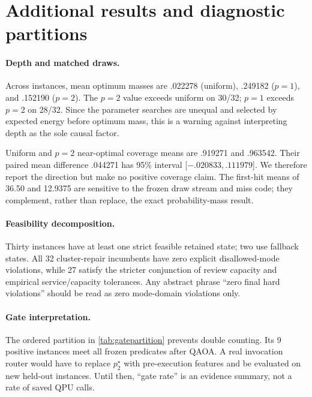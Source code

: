 \section{Additional results and diagnostic partitions}
\label{app:additional}



\paragraph{Depth and matched draws.}
Across instances, mean optimum masses are .022278 (uniform), .249182 ($p=1$), and .152190 ($p=2$). The $p=2$ value exceeds uniform on 30/32; $p=1$ exceeds $p=2$ on 28/32. Since the parameter searches are unequal and selected by expected energy before optimum mass, this is a warning against interpreting depth as the sole causal factor.

Uniform and $p=2$ near-optimal coverage means are .919271 and .963542. Their paired mean difference .044271 has 95\% interval [$-.020833,.111979$]. We therefore report the direction but make no positive coverage claim. The first-hit means of 36.50 and 12.9375 are sensitive to the frozen draw stream and miss code; they complement, rather than replace, the exact probability-mass result.

\paragraph{Feasibility decomposition.}
Thirty instances have at least one strict feasible retained state; two use fallback states. All 32 cluster-repair incumbents have zero explicit disallowed-mode violations, while 27 satisfy the stricter conjunction of review capacity and empirical service/capacity tolerances. Any abstract phrase ``zero final hard violations'' should be read as zero mode-domain violations only.

\paragraph{Gate interpretation.}
The ordered partition in \cref{tab:gatepartition} prevents double counting. Its 9 positive instances meet all frozen predicates after QAOA. A real invocation router would have to replace $p_2^\star$ with pre-execution features and be evaluated on new held-out instances. Until then, ``gate rate'' is an evidence summary, not a rate of saved QPU calls.

